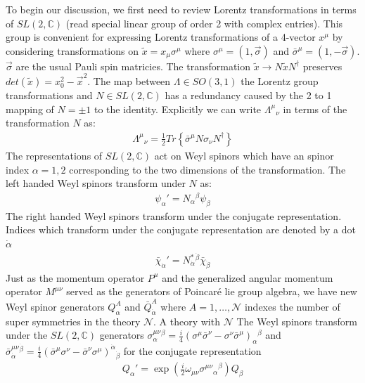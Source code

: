 To begin our discussion, we first need to review Lorentz transformations in terms of $SL(2,\mathbb{C})$
(read special linear group of order 2 with complex entries).  This group is convenient for 
expressing Lorentz transformations of a 4-vector $x^\mu$ by considering transformations on $\tilde{x} = x_\mu \sigma^\mu$ 
where $\sigma^\mu = (1,\vec \sigma)$ and $\bar{\sigma}^\mu = (1,-\vec \sigma)$. $\vec{\sigma}$ are 
the usual Pauli spin matricies. The transformation $\tilde x \rightarrow N \tilde x N^\dagger$ preserves
$det(\tilde{x}) = x_0^2 - \vec{x}^2$. The map between $\Lambda \in SO(3,1)$ the Lorentz group 
transformations
and $N \in SL(2,\mathbb{C})$ has a redundancy caused by the 2 to 1 mapping of $N= \pm 1$ to the identity. Explicitly 
we can write $\Lambda^\mu{}_\nu$ in terms of the transformation $N$ as:
\begin{align*}
\Lambda^\mu{}_\nu = \frac{1}{2} Tr \left \{ \bar{\sigma}^\mu N \sigma_\nu N^\dagger \right \}
\end{align*}
The representations of $SL(2,\mathbb{C})$ act on Weyl spinors which 
have an spinor index $\alpha=1,2$ corresponding to the two dimensions of the transformation. 
The left handed Weyl spinors transform under $N$ as:
\begin{align*}
\psi_\alpha ' = N_{\alpha}{}^\beta \psi_\beta 
\end{align*}
The right handed Weyl spinors transform under the conjugate representation. Indices which transform under the conjugate representation are denoted by a dot $\dot\alpha$
\begin{align*}
\bar{\chi}_{\dot \alpha}' =  N_{\dot \alpha}^*{}^{\dot \beta} \bar{\chi}_{\dot \beta}
\end{align*}
Just as the momentum operator $P^\mu$ and the generalized angular momentum operator $M^{\mu\nu}$ served 
as the generators of Poincar\'{e} lie group algebra, we have new Weyl spinor generators $Q_{\alpha}^A$
 and $\bar{Q}_{\dot{\alpha}}^A$ where $A=1,\ldots, \mathcal{N}$ indexes the number of super symmetries 
in the theory $\mathcal{N}$. A theory with $\mathcal{N}$ The Weyl spinors transform under the $SL(2, \mathbb{C})$ generators
$\sigma^{\mu\nu}_\alpha{}^{\beta} = \frac{i}{4}(\sigma^\mu \bar{\sigma}^\nu - \sigma^\nu\bar{\sigma}^\mu)_\alpha{}^\beta$
 and $\bar{\sigma}^{\mu\nu}_{\dot{\alpha}}{}^{\dot{\beta}} = \frac{i}{4}(\bar{\sigma}^\mu \sigma^\nu - \bar{\sigma}^\nu\sigma^\mu)^{\dot{\alpha}}{}_{\dot{\beta}}$ for the conjugate representation
\begin{align*}
Q_\alpha' = \exp \left ( \frac{i}{2} \omega_{\mu\nu} \sigma^{\mu\nu}{}_\alpha{}^\beta  \right ) Q_\beta
\end{align*}
